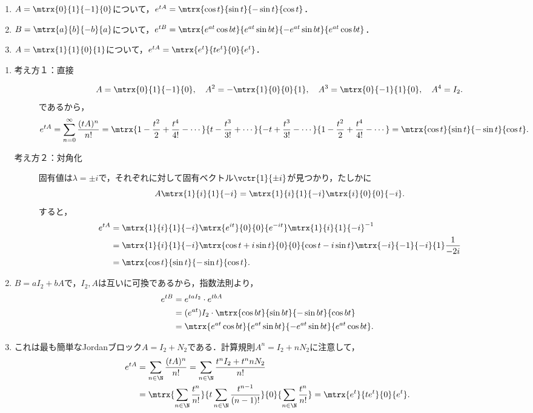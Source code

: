 \documentclass[uplatex,dvipdfmx]{jsarticle}
\begin{document}
\begin{example}\mbox{}
    \begin{enumerate}
        \item $A=\mtrx{0}{1}{-1}{0}$について，$e^{tA}=\mtrx{\cos t}{\sin t}{-\sin t}{\cos t}$．
        \item $B=\mtrx{a}{b}{-b}{a}$について，$e^{tB}=\mtrx{e^{at}\cos bt}{e^{at}\sin bt}{-e^{at}\sin bt}{e^{at}\cos bt}$．
        \item $A=\mtrx{1}{1}{0}{1}$について，$e^{tA}=\mtrx{e^t}{te^t}{0}{e^t}$．
    \end{enumerate}
\end{example}
\begin{Proof}\mbox{}
    \begin{enumerate}
        \item 
        \begin{description}
            \item[考え方１：直接] \[A=\mtrx{0}{1}{-1}{0},\quad A^2=-\mtrx{1}{0}{0}{1},\quad A^3=\mtrx{0}{-1}{1}{0},\quad A^4=I_2.\]
            であるから，
            \[e^{tA}=\sum_{n=0}^\infty\frac{(tA)^n}{n!}=\mtrx{1-\frac{t^2}{2}+\frac{t^4}{4!}-\cdots}{t-\frac{t^3}{3!}+\cdots}{-t+\frac{t^3}{3!}-\cdots}{1-\frac{t^2}{2}+\frac{t^4}{4!}-\cdots}=\mtrx{\cos t}{\sin t}{-\sin t}{\cos t}.\]
            \item[考え方２：対角化] 固有値は$\lambda=\pm i$で，それぞれに対して固有ベクトル$\vctr{1}{\pm i}$が見つかり，たしかに
            \[A\mtrx{1}{i}{1}{-i}=\mtrx{1}{i}{1}{-i}\mtrx{i}{0}{0}{-i}.\]
            すると，
            \begin{align*}
                e^{tA}&=\mtrx{1}{i}{1}{-i}\mtrx{e^{it}}{0}{0}{e^{-it}}\mtrx{1}{i}{1}{-i}^{-1}\\
                &=\mtrx{1}{i}{1}{-i}\mtrx{\cos t+i\sin t}{0}{0}{\cos t-i\sin t}\mtrx{-i}{-1}{-i}{1}\frac{1}{-2i}\\
                &=\mtrx{\cos t}{\sin t}{-\sin t}{\cos t}.
            \end{align*}
            \end{description}
        \item $B=aI_2+bA$で，$I_2,A$は互いに可換であるから，指数法則より，
        \begin{align*}
            e^{tB}&=e^{taI_2}\cdot e^{tbA}\\
            &=(e^{at})I_2\cdot \mtrx{\cos bt}{\sin bt}{-\sin bt}{\cos bt}\\
            &=\mtrx{e^{at}\cos bt}{e^{at}\sin bt}{-e^{at}\sin bt}{e^{at}\cos bt}.
        \end{align*}
        \item これは最も簡単なJordanブロック$A=I_2+N_2$である．計算規則$A^n=I_2+nN_2$に注意して，
        \begin{align*}
            e^{tA}&=\sum_{n\in\N}\frac{(tA)^n}{n!}=\sum_{n\in\N}\frac{t^nI_2+t^nnN_2}{n!}\\
            &=\mtrx{\sum_{n\in\N}\frac{t^n}{n!}}{t\sum_{n\in\N}\frac{t^{n-1}}{(n-1)!}}{0}{\sum_{n\in\N}\frac{t^n}{n!}}=\mtrx{e^t}{te^t}{0}{e^t}.
        \end{align*}
    \end{enumerate}
\end{Proof}
\end{document}
